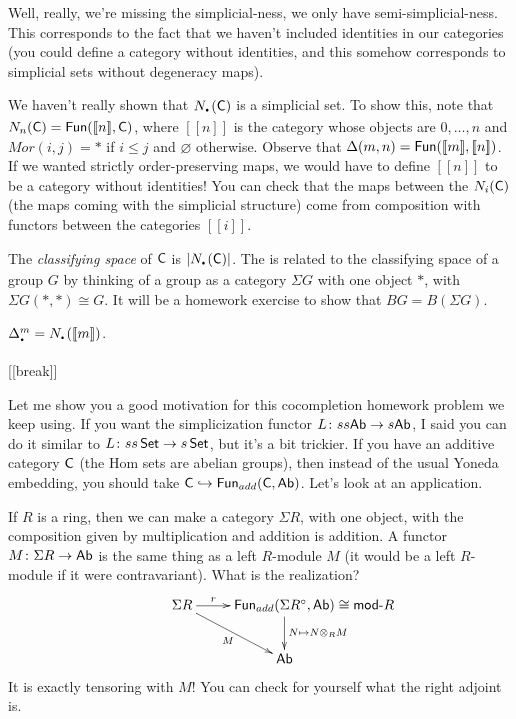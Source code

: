 Well, really, we're missing the simplicial-ness, we only have semi-simplicial-ness. This corresponds to the fact that we haven't included identities in our categories (you could define a category without identities, and this somehow corresponds to simplicial sets without degeneracy maps).

We haven't really shown that $N_\udot(\C)$ is a simplicial set. To show this, note that $N_n(\text{\sf C})=\text{\sf Fun}([\![n]\!],\text{\sf C})$, where $[\![n]\!]$ is the category whose objects are $0,\dots, n$ and $Mor(i,j)=*$ if $i\le j$ and $\varnothing$ otherwise. Observe that $\Delta(m,n)=\text{\sf Fun}([\![m]\!],[\![n]\!])$. If we wanted strictly order-preserving maps, we would have to define $[\![n]\!]$ to be a category without identities! You can check that the maps between the $N_i(\text{\sf C})$ (the maps coming with the simplicial structure) come from composition with functors between the categories $[\![i]\!]$.

\begin{remark}
 The \emph{classifying space} of $\text{\sf C}$ is $|N_\udot(\C)|$. The is related to the classifying space of a group $G$ by thinking of a group as a category $\Sigma G$ with one object $*$, with $\Sigma G(*,*)\cong G$. It will be a homework exercise to show that $BG=B(\Sigma G)$.
\end{remark}
\begin{example}
 $\Delta_\udot^m = N_\udot([\![m]\!])$.
\end{example}

[[break]]

Let me show you a good motivation for this cocompletion homework problem we keep using. If you want the simplicization functor $L\colon ss\text{\sf Ab}\to s\text{\sf Ab}$, I said you can do it similar to $L\colon ss\operatorname{\sf Set}\to s\operatorname{\sf Set}$, but it's a bit trickier. If you have an additive category $\text{\sf C}$ (the Hom sets are abelian groups), then instead of the usual Yoneda embedding, you should take $\text{\sf C}\hookrightarrow \text{\sf Fun}_{add}(\text{\sf C},\text{\sf Ab})$. Let's look at an application.

If $R$ is a ring, then we can make a category $\Sigma R$, with one object, with the composition given by multiplication and addition is addition. A functor $M\colon \Sigma R\to \text{\sf Ab}$ is the same thing as a left $R$-module $M$ (it would be a left $R$-module if it were contravariant). What is the realization?
\[\xymatrix{
 \Sigma R \ar[dr]_M \ar[r]^-r & \fun_{add}(\Sigma R^\circ, \ab) \rlap{$\;\cong \rmod R$}\ar[d]^{N\mapsto N\otimes_R M}\\
 & \ab
}\]
It is exactly tensoring with $M$! You can check for yourself what the right adjoint is.

